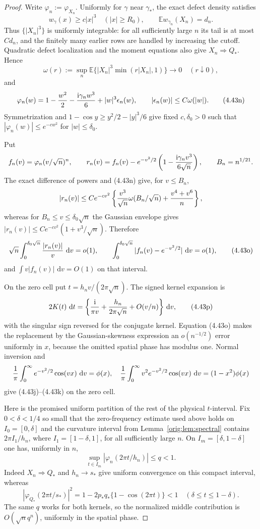 \documentclass[11pt,a4paper]{article}
\numberwithin{equation}{section}
\theoremstyle{definition}
\theoremstyle{remark}
\newcommand{\E}{\mathbb E}
\newcommand{\ii}{\mathrm i}
\newcommand{\dd}{\,\mathrm d}
\begin{document}
\begin{proof}
Write $\varphi_n:=\varphi_{X_n}$.
Uniformly for $\gamma$ near $\gamma_*$, the exact defect density satisfies
\[
 w_\gamma(x)\ge c|x|^3\quad(|x|\ge R_0),\qquad
 \E w_{\gamma_n}(X_n)=d_n.                            \tag{4.43l}
\]
Thus $\{|X_n|^3\}$ is uniformly integrable: for all sufficiently large
$n$ its tail is at most $Cd_n$, and the finitely many earlier rows are
handled by increasing the cutoff.  Quadratic defect localization and the
moment equations also give $X_n\Rightarrow Q_*$.  Hence
\[
 \omega(r):=\sup_n\E\{|X_n|^3\min(r|X_n|,1)\}\longrightarrow0
 \quad(r\downarrow0),                                 \tag{4.43m}
\]
and
\[
 \varphi_n(w)=1-{w^2\over2}-{\ii\gamma_nw^3\over6}
                  +|w|^3\epsilon_n(w),\qquad
 |\epsilon_n(w)|\le C\omega(|w|).                    \tag{4.43n}
\]
Symmetrization and $1-\cos y\ge y^2/2-|y|^3/6$ give fixed
$c,\delta_0>0$ such that $|\varphi_n(w)|\le e^{-cw^2}$ for
$|w|\le\delta_0$.

Put
\[
 f_n(v)=\varphi_n(v/\sqrt n)^n,\qquad
 r_n(v)=f_n(v)-e^{-v^2/2}
 \left(1-{\ii\gamma_nv^3\over6\sqrt n}\right),\qquad B_n=n^{1/21}.
\]
The exact difference of powers and (4.43n) give, for $v\le B_n$,
\[
 |r_n(v)|\le Ce^{-cv^2}\left\{
 {v^3\over\sqrt n}\omega(B_n/\sqrt n)+{v^4+v^6\over n}\right\},
\]
whereas for $B_n\le v\le\delta_0\sqrt n$ the Gaussian envelope gives
$|r_n(v)|\le Ce^{-cv^2}(1+v^3/\sqrt n)$.  Therefore
\[
 \sqrt n\int_0^{\delta_0\sqrt n}{|r_n(v)|\over v}\,\dd v=o(1),
 \qquad
 \int_0^{\delta_0\sqrt n}|f_n(v)-e^{-v^2/2}|\,\dd v=o(1),          \tag{4.43o}
\]
and $\int v|f_n(v)|\,\dd v=O(1)$ on that interval.

On the zero cell put $t=h_nv/(2\pi\sqrt n)$.  The signed kernel expansion is
\[
 2K(t)\,\dd t=\left\{{\ii\over\pi v}
       +{h_n\over2\pi\sqrt n}+O(v/n)\right\}\dd v,                \tag{4.43p}
\]
with the singular sign reversed for the conjugate kernel.  Equation
(4.43o) makes the replacement by the Gaussian-skewness expression an
$o(n^{-1/2})$ error uniformly in $x$, because the omitted spatial phase
has modulus one.  Normal inversion and
\[
 {1\over\pi}\int_0^\infty e^{-v^2/2}\cos(vx)\,\dd v=\phi(x),
 \quad
 {1\over\pi}\int_0^\infty v^2e^{-v^2/2}\cos(vx)\,\dd v
 =(1-x^2)\phi(x)
\]
give (4.43j)--(4.43k) on the zero cell.

Here is the promised uniform partition of the rest of the physical
$t$-interval.  Fix $0<\delta<1/4$ so small that the zero-frequency
estimate used above holds on $I_0=[0,\delta]$ and the curvature interval
from Lemma~\ref{orig:lem:spectral} contains
$2\pi I_1/h_n$, where $I_1=[1-\delta,1]$, for all sufficiently large
$n$.  On $I_m=[\delta,1-\delta]$ one has, uniformly in $n$,
\[
 \sup_{t\in I_m}|\varphi_n(2\pi t/h_n)|\le q<1.       \tag{4.43q0}
\]
Indeed $X_n\Rightarrow Q_*$ and $h_n\to s_*$ give uniform convergence
on this compact interval, whereas
\[
 |\varphi_{Q_*}(2\pi t/s_*)|^2
 =1-2p_*q_*\{1-\cos(2\pi t)\}<1
 \quad(\delta\le t\le1-\delta).
\]
The same $q$ works for both kernels, so the normalized middle
contribution is $O(\sqrt n q^n)$, uniformly in the spatial phase.


\end{proof}
\end{document}
